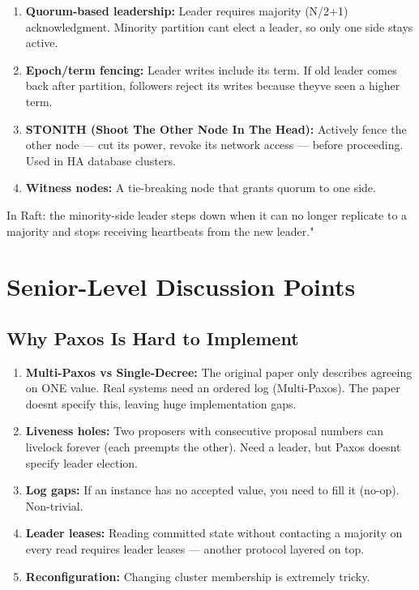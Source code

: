\documentclass[11pt]{article}
\providecommand{\tightlist}{\setlength{\itemsep}{1pt}\setlength{\parskip}{0pt}}
\begin{document}
\begin{enumerate}
\def\labelenumi{\arabic{enumi}.}
\tightlist
\item
  \textbf{Quorum-based leadership:} Leader requires majority (N/2+1) acknowledgment. Minority partition can\textquotesingle t elect a leader, so only one side stays active.
\item
  \textbf{Epoch/term fencing:} Leader writes include its term. If old leader comes back after partition, followers reject its writes because they\textquotesingle ve seen a higher term.
\item
  \textbf{STONITH (Shoot The Other Node In The Head):} Actively fence the other node --- cut its power, revoke its network access --- before proceeding. Used in HA database clusters.
\item
  \textbf{Witness nodes:} A tie-breaking node that grants quorum to one side.
\end{enumerate}

In Raft: the minority-side leader steps down when it can no longer replicate to a majority and stops receiving heartbeats from the new leader."

\section{Senior-Level Discussion Points}\label{senior-level-discussion-points}

\subsection{Why Paxos Is Hard to Implement}\label{why-paxos-is-hard-to-implement}

\begin{enumerate}
\def\labelenumi{\arabic{enumi}.}
\tightlist
\item
  \textbf{Multi-Paxos vs Single-Decree:} The original paper only describes agreeing on ONE value. Real systems need an ordered log (Multi-Paxos). The paper doesn\textquotesingle t specify this, leaving huge implementation gaps.
\item
  \textbf{Liveness holes:} Two proposers with consecutive proposal numbers can livelock forever (each preempts the other). Need a leader, but Paxos doesn\textquotesingle t specify leader election.
\item
  \textbf{Log gaps:} If an instance has no accepted value, you need to fill it (no-op). Non-trivial.
\item
  \textbf{Leader leases:} Reading committed state without contacting a majority on every read requires leader leases --- another protocol layered on top.
\item
  \textbf{Reconfiguration:} Changing cluster membership is extremely tricky.
\end{enumerate}
\end{document}
